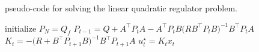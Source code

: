 \begin{algorithm}[tb]
	\caption{pseudo-code for solving the linear quadratic regulator problem.}\label{alg:LQR}
	\begin{algorithmic}
		\State initialize $P_N = Q_f$
		\State
		 
			\State $P_{t-1} = Q + A^\top P_t A - A^\top P_t B\big(RB^\top P_tB\big)^{-1} B^\top P_t A$
		\EndFor
		\State
		 
			\State $K_t = -\big(R + B^\top P_{t+1}B\big)^{-1}B^\top P_{t+1}A$
			\State $u_t^\star = K_t x_t$ 
		\EndFor
	\end{algorithmic}
\end{algorithm}